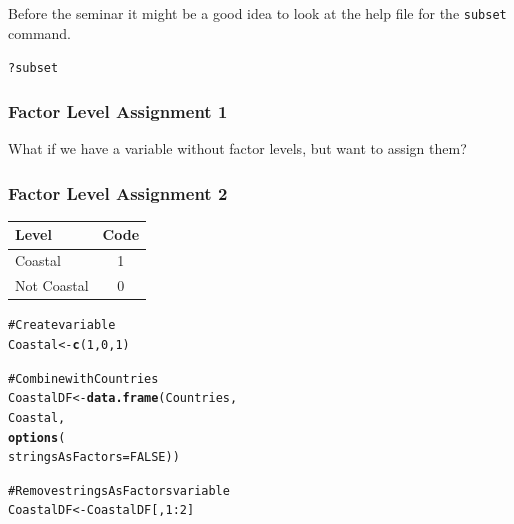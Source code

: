 \documentclass{beamer}\usepackage{graphicx, color}
\makeatletter
\newcommand{\hlfunctioncall}[1]{\textcolor[rgb]{0.501960784313725,0,0.329411764705882}{\textbf{#1}}}%
\newcommand{\hlcomment}[1]{\textcolor[rgb]{0.180392156862745,0.6,0.341176470588235}{#1}}%
\newenvironment{kframe}{%
 \def\at@end@of@kframe{}%
 \ifinner\ifhmode%
  \def\at@end@of@kframe{\end{minipage}}%
  \begin{minipage}{\columnwidth}%
 \fi\fi%
 \def\FrameCommand##1{\hskip\@totalleftmargin \hskip-\fboxsep
 \colorbox{shadecolor}{##1}\hskip-\fboxsep
     \hskip-\linewidth \hskip-\@totalleftmargin \hskip\columnwidth}%
 \MakeFramed {\advance\hsize-\width
   \@totalleftmargin\z@ \linewidth\hsize
   \@setminipage}}%
 {\par\unskip\endMakeFramed%
 \at@end@of@kframe}
\newenvironment{knitrout}{}{} %
\makeatother
\begin{document}
\begin{frame}[fragile]
  Before the seminar it might be a good idea to look at the help file for the \texttt{subset} command.
\begin{knitrout}
\color{fgcolor}\begin{kframe}
\begin{alltt}
?subset
\end{alltt}
\end{kframe}
\end{knitrout}

\end{frame}

\begin{frame}[fragile]
  \frametitle{Factor Level Assignment 1}
  What if we have a variable without factor levels, but want to assign them?
\end{frame}

\begin{frame}[fragile]
  \frametitle{Factor Level Assignment 2}
  \begin{small}
  \begin{table}
    \begin{tabular}{l c}
    \hline
    Level & Code \\
    \hline \hline
    Coastal & 1 \\ \hline
    Not Coastal & 0
    \end{tabular}
  \end{table}
  \end{small}
\end{frame}

\begin{frame}[fragile]
\begin{knitrout}
\color{fgcolor}\begin{kframe}
\begin{alltt}
\hlcomment{# Create variable}
Coastal <- \hlfunctioncall{c}(1, 0, 1)

\hlcomment{# Combine with Countries}
CoastalDF <- \hlfunctioncall{data.frame}(Countries,
                        Coastal,
                        \hlfunctioncall{options}(
                          stringsAsFactors = FALSE))

\hlcomment{# Remove stringsAsFactors variable}
CoastalDF <- CoastalDF[, 1:2]
\end{alltt}
\end{kframe}
\end{knitrout}

\end{frame}
\end{document}
